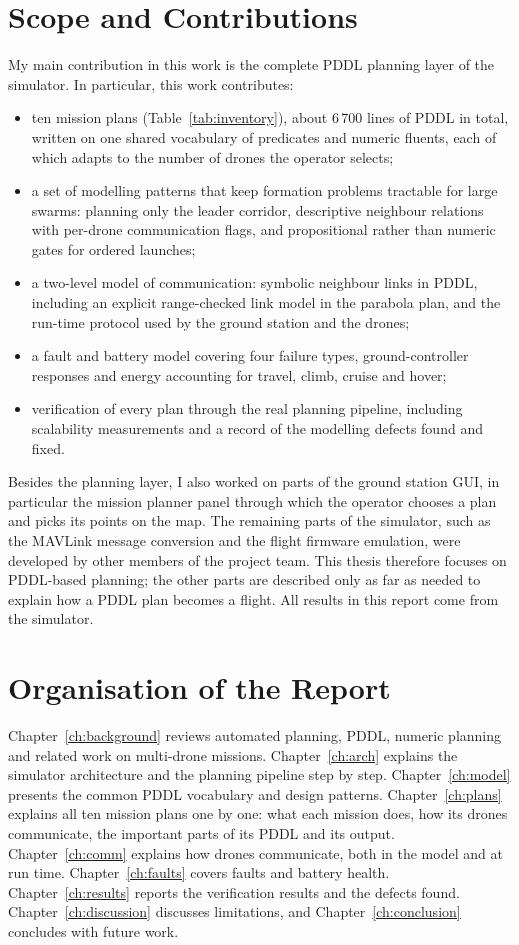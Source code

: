 \documentclass[11pt,a4paper,oneside]{report}
\begin{document}
\section{Scope and Contributions}
My main contribution in this work is the complete PDDL planning layer of the simulator. In
particular, this work contributes:
\begin{itemize}
  \item ten mission plans (Table~\ref{tab:inventory}), about 6\,700 lines of PDDL in total,
        written on one shared vocabulary of predicates and numeric fluents, each of which adapts
        to the number of drones the operator selects;
  \item a set of modelling patterns that keep formation problems tractable for large swarms:
        planning only the leader corridor, descriptive neighbour relations with per-drone
        communication flags, and propositional rather than numeric gates for ordered launches;
  \item a two-level model of communication: symbolic neighbour links in PDDL, including an
        explicit range-checked link model in the parabola plan, and the run-time protocol used
        by the ground station and the drones;
  \item a fault and battery model covering four failure types, ground-controller responses and
        energy accounting for travel, climb, cruise and hover;
  \item verification of every plan through the real planning pipeline, including scalability
        measurements and a record of the modelling defects found and fixed.
\end{itemize}

Besides the planning layer, I also worked on parts of the ground station GUI, in particular the
mission planner panel through which the operator chooses a plan and picks its points on the map.
The remaining parts of the simulator, such as the MAVLink message conversion and the flight
firmware emulation, were developed by other members of the project team. This thesis therefore
focuses on PDDL-based planning; the other parts are described only as far as needed to explain
how a PDDL plan becomes a flight. All results in this report come from the simulator.

\section{Organisation of the Report}
Chapter~\ref{ch:background} reviews automated planning, PDDL, numeric planning and related work
on multi-drone missions. Chapter~\ref{ch:arch} explains the simulator architecture and the
planning pipeline step by step. Chapter~\ref{ch:model} presents the common PDDL vocabulary and
design patterns. Chapter~\ref{ch:plans} explains all ten mission plans one by one: what each
mission does, how its drones communicate, the important parts of its PDDL and its output.
Chapter~\ref{ch:comm} explains how drones communicate, both in the model and at run time.
Chapter~\ref{ch:faults} covers faults and battery health. Chapter~\ref{ch:results} reports the
verification results and the defects found. Chapter~\ref{ch:discussion} discusses limitations,
and Chapter~\ref{ch:conclusion} concludes with future work.
\end{document}
